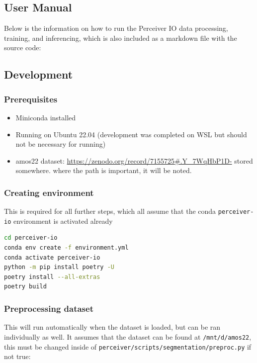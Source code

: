\documentclass{l4proj}
\begin{document}
\begin{appendices}

\chapter{User Manual} \label{chap:appendices}

Below is the information on how to run the Perceiver IO data processing, training, and inferencing, which is also included as a markdown file with the source code:

\section{Development}

\subsection{Prerequisites}

\begin{itemize}
  \item{Miniconda installed}
  \item{Running on Ubuntu 22.04 (development was completed on WSL but should not be necessary for running)}
  \item{amos22 dataset: \url{https://zenodo.org/record/7155725#.Y_7WqHbP1D-} stored somewhere. where the path is important, it will be noted.}
\end{itemize}

\subsection{Creating environment}

This is required for all further steps, which all assume that the conda \lstinline{perceiver-io} environment is activated already

\begin{lstlisting}[language=bash]
cd perceiver-io
conda env create -f environment.yml
conda activate perceiver-io
python -m pip install poetry -U
poetry install --all-extras
poetry build
\end{lstlisting}

\subsection{Preprocessing dataset}

This will run automatically when the dataset is loaded, but can be ran individually as well. It assumes that the dataset can be found at \lstinline{/mnt/d/amos22}, this must be changed inside of \lstinline{perceiver/scripts/segmentation/preproc.py} if not true:


\end{appendices}
\end{document}
